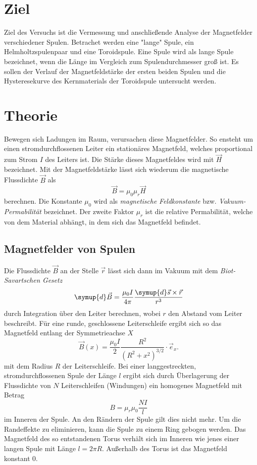 \section{Ziel}
\label{sec:Ziel}
Ziel des Versuchs ist die Vermessung und anschließende Analyse der Magnetfelder verschiedener Spulen. Betrachet werden eine "lange" \: Spule, ein Helmholtzspulenpaar und eine 
Toroidspule. Eine Spule wird als lange Spule bezeichnet, wenn die Länge im Vergleich zum Spulendurchmesser groß ist.
Es sollen der Verlauf der Magnetfeldstärke der ersten beiden Spulen und die Hysteresekurve des Kernmaterials der Toroidspule untersucht werden.

\section{Theorie}
\label{sec:Theorie}
Bewegen sich Ladungen im Raum, verursachen diese Magnetfelder. So ensteht um einen stromdurchflossenen Leiter ein stationäres Magnetfeld, welches proportional zum Strom 
$I$ des Leiters ist. Die Stärke dieses Magnetfeldes wird mit $\vec{H}$ bezeichnet. Mit der Magnetfeldstärke lässt sich wiederum die magnetische Flussdichte $\vec{B}$ als 
\begin{equation}
    \label{eqn:Flussdichte}
    \vec{B} = \mu_0 \mu_r \vec{H}
\end{equation} 
berechnen. Die Konstante $\mu_0$ wird als \textit{magnetische Feldkonstante} bzw. \textit{Vakuum-Permabilität} bezeichnet. Der zweite Faktor $\mu_r$ ist die relative Permabilität,
welche von dem Material abhängt, in dem sich das Magnetfeld befindet. 

\subsection{Magnetfelder von Spulen}
\label{subsec:Spulen}
Die Flussdichte $\vec{B}$ an der Stelle $\vec{r}$ lässt sich dann im Vakuum mit dem \textit{Biot-Savartschen Gesetz}
\begin{equation}
    \label{eqn:BiotSavart}
    \symup{d} \vec{B} = \frac{\mu_0 I}{4 \pi}\frac{\symup{d}\vec{s} \times \vec{r}}{r^3}
\end{equation}
durch Integration über den Leiter berechnen, wobei $r$ den Abstand vom Leiter beschreibt. Für eine runde, geschlossene Leiterschleife ergibt sich so das Magnetfeld
entlang der Symmetrieachse $X$
\begin{equation*}
    \vec{B}(x) = \frac{\mu_0 I}{2} \frac{R^2}{(R^2+x^2)^{3/2}} \cdot {\vec{e}_x}.
\end{equation*}
mit dem Radius $R$ der Leiterschleife.
Bei einer langgestreckten, stromdurchflossenen Spule der Länge $l$ ergibt sich durch Überlagerung der Flussdichte von $N$ Leiterschleifen (Windungen) ein homogenes Magnetfeld mit 
Betrag
\begin{equation}
    \label{eqn:LangeSpule}
    B = \mu_r \mu_0 \frac{N I}{l}
\end{equation}
im Inneren der Spule. An den Rändern der Spule gilt dies nicht mehr. 
Um die Randeffekte zu eliminieren, kann die Spule zu einem Ring gebogen werden. Das Magnetfeld des so entstandenen Torus verhält sich im Inneren wie jenes einer langen Spule mit
Länge $l = 2\pi R$. Außerhalb des Torus ist das Magnetfeld konstant 0. 

